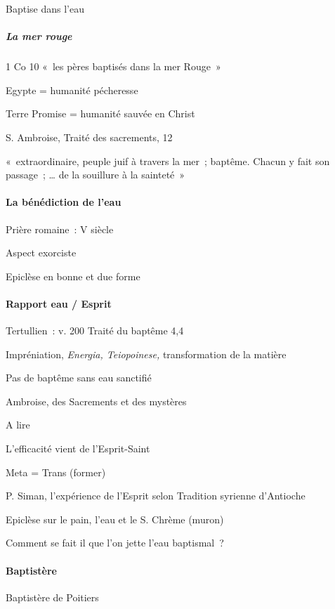 Baptise dans l'eau

\hypertarget{la-mer-rouge}{%
\subparagraph{La mer rouge}\label{la-mer-rouge}}

1 Co 10 «~les pères baptisés dans la mer Rouge~»

Egypte = humanité pécheresse

Terre Promise = humanité sauvée en Christ

S. Ambroise, Traité des sacrements, 12

«~extraordinaire, peuple juif à travers la mer~; baptême. Chacun y fait
son passage~; \ldots{} de la souillure à la sainteté~»

\hypertarget{la-buxe9nuxe9diction-de-leau}{%
\paragraph{La bénédiction de
l'eau}\label{la-buxe9nuxe9diction-de-leau}}

Prière romaine~: V siècle

Aspect exorciste

Epiclèse en bonne et due forme

\hypertarget{rapport-eau-esprit}{%
\paragraph{Rapport eau / Esprit}\label{rapport-eau-esprit}}

Tertullien~: v. 200 Traité du baptême 4,4

Impréniation, \emph{Energia, Teiopoinese,} transformation de la matière

Pas de baptême sans eau sanctifié

Ambroise, des Sacrements et des mystères

A lire

L'efficacité vient de l'Esprit-Saint

Meta = Trans (former)

P. Siman, l'expérience de l'Esprit selon Tradition syrienne d'Antioche

Epiclèse sur le pain, l'eau et le S. Chrème (muron)

Comment se fait il que l'on jette l'eau baptismal~?

\hypertarget{baptistuxe8re}{%
\paragraph{Baptistère}\label{baptistuxe8re}}

Baptistère de Poitiers

